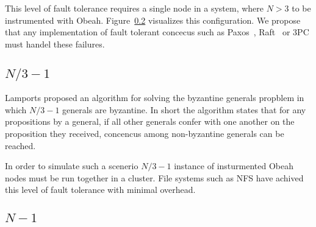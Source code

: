 This level of fault tolerance requires a single node in a system, where $N > 3$ to be instrumented with Obeah. Figure~\ref{} visualizes this configuration. We propose that any implementation of fault tolerant concecus such as Paxos~\cite{}, Raft~\cite{} or 3PC must handel these failures.

\subsection{$N/3 -1$}

Lamports proposed an algorithm for solving the byzantine generals propblem in
which $N/3-1$ generals are byzantine. In short the algorithm states that for
any propositions by a general, if all other generals confer with one another on
the proposition they received, concencus among non-byzantine generals can be
reached.

In order to simulate such a scenerio $N/3 - 1$ instance of insturmented Obeah
nodes must be run together in a cluster. File systems such as NFS have achived this level of fault tolerance with minimal overhead.

\subsection{$N-1$}
